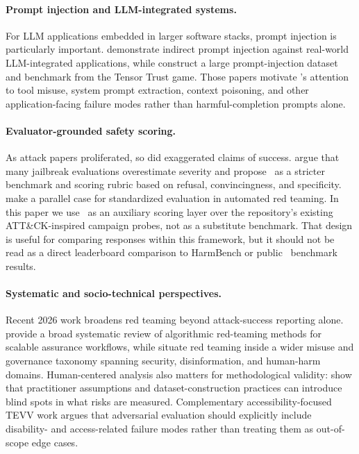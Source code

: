 \paragraph{Prompt injection and LLM-integrated systems.}
For LLM applications embedded in larger software stacks, prompt injection is
particularly important. \citet{greshake2023notwhat} demonstrate indirect prompt
injection against real-world LLM-integrated applications, while
\citet{toyer2024tensortrust} construct a large prompt-injection dataset and
benchmark from the Tensor Trust game. Those papers motivate \system's attention
to tool misuse, system prompt extraction, context poisoning, and other
application-facing failure modes rather than harmful-completion prompts alone.

\paragraph{Evaluator-grounded safety scoring.}
As attack papers proliferated, so did exaggerated claims of success.
\citet{souly2024strongreject} argue that many jailbreak evaluations overestimate
severity and propose \sr\ as a stricter benchmark and scoring rubric based on
refusal, convincingness, and specificity. \citet{mazeika2024harmbench} make a
parallel case for standardized evaluation in automated red teaming. In this
paper we use \sr\ as an auxiliary scoring layer over the repository's existing
ATT\&CK-inspired campaign probes, not as a substitute benchmark. That design is
useful for comparing responses within this framework, but it should not be read
as a direct leaderboard comparison to HarmBench or public \sr\ benchmark
results.

\paragraph{Systematic and socio-technical perspectives.}
Recent 2026 work broadens red teaming beyond attack-success reporting alone.
\citet{srivastava2026systematicredteaming} provide a broad systematic review of
algorithmic red-teaming methods for scalable assurance workflows, while
\citet{seghid2026emergingthreats} situate red teaming inside a wider misuse and
governance taxonomy spanning security, disinformation, and human-harm domains.
Human-centered analysis also matters for methodological validity:
\citet{alvaradogarcia2026sociotechnical} show that practitioner assumptions and
dataset-construction practices can introduce blind spots in what risks are
measured. Complementary accessibility-focused TEVV work
\citep{waters2026accessibilitytevv} argues that adversarial evaluation should
explicitly include disability- and access-related failure modes rather than
treating them as out-of-scope edge cases.

